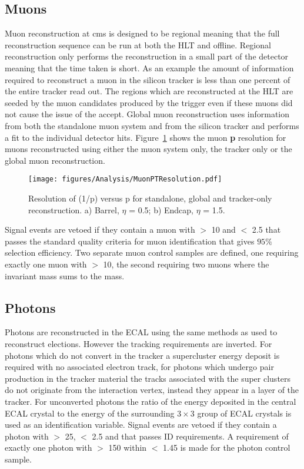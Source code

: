 \subsection{Muons} %
\label{sub:muons}
Muon reconstruction at \ac{cms} is designed to be regional meaning that the 
full reconstruction sequence can be run at both the HLT and offline. Regional 
reconstruction only performs the reconstruction in a small part of the detector 
meaning that the time taken is short. As an example the amount of information 
required to reconstruct a muon in the silicon tracker is less than one percent 
of the entire tracker read out. The regions which are reconstructed at the HLT 
are seeded by the muon candidates produced by the \Lone trigger even if these 
muons did not cause the issue of the \Lone accept. Global muon reconstruction 
uses information from both the standalone muon system and from the silicon 
tracker and performs a fit to the individual detector hits.
Figure~\ref{fig:figures_Analysis_MuonPTResolution} shows the muon \textbf{p}
resolution for muons reconstructed using either the muon system only, the 
tracker only or the global muon reconstruction.
\begin{figure}[htbp]
  \centering
    \texttt{[image: figures/Analysis/MuonPTResolution.pdf]}
  \caption{Resolution of (1/p) versus p for standalone, global and tracker-only reconstruction. a) Barrel, $\eta$ = 0.5; b) Endcap, $\eta$ = 1.5.\cite{0954-3899-34-6-S01}}
  \label{fig:figures_Analysis_MuonPTResolution}
\end{figure}

Signal events are vetoed if they contain a muon with \PT $>$ \unit{10}{\GeV} 
and \mETA $<$ 2.5 that passes the standard quality criteria for muon 
identification that gives $95\%$ selection efficiency\cite{PAS-MUO-10-002}. Two 
separate muon control samples are defined, one requiring exactly one muon with 
\PT $>$ \unit{10}{\GeV}, the second requiring two muons where the invariant 
mass sums to the \PZ mass. 


\subsection{Photons} %
\label{sub:photons}
Photons are reconstructed in the ECAL using the same methods as used to 
reconstruct elections. However the tracking requirements are inverted. For 
photons which do not convert in the tracker a supercluster energy deposit is 
required with no associated electron track, for photons which undergo pair 
production in the tracker material the tracks associated with the super 
clusters do not originate from the interaction vertex, instead they appear in a 
layer of the tracker. For unconverted photons the ratio of the energy deposited 
in the central ECAL crystal to the energy of the surrounding $3\times3$ group 
of ECAL crystals is used as an identification variable. Signal events are 
vetoed if they contain a photon with \ET $>$ \unit{25}{\GeV}, \mETA $<$ 2.5 and 
that passes ID requirements\cite{PAS-EGM-10-006}. A requirement of exactly one 
photon with \ET $>$ \unit{150}{\GeV} within \mETA $<$ 1.45 is made for the 
photon control sample.

